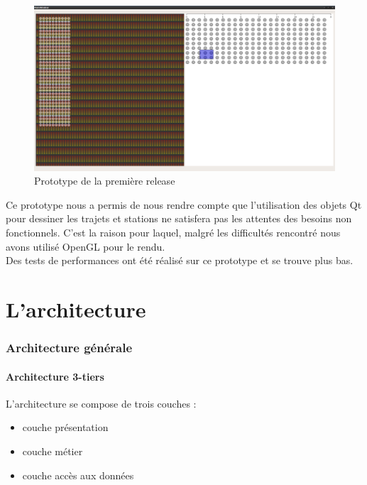 \documentclass[12pt]{article}
\begin{document}
	\begin{figure}[!h]
	\begin{center}
	\includegraphics[scale=0.2]{prototype1_screen_shot.png}
	\caption{Prototype de la première release}
	\end{center}
	\end{figure}		
	
	Ce prototype nous a permis de nous rendre compte que l’utilisation des objets Qt pour
	dessiner les trajets et stations ne satisfera pas les attentes des besoins non
	fonctionnels. C’est la raison pour laquel, malgré les difficultés rencontré
	nous avons utilisé OpenGL pour le rendu.\\
	
	Des tests de performances ont été réalisé sur ce prototype et se trouve plus bas.\\

\part{L'architecture}

	\section{Architecture générale}
		\subsection{Architecture 3-tiers}
		L’architecture se compose de trois couches :
		\begin{itemize}
			\item couche présentation
			\item couche métier 
			\item couche accès aux données
		\end{itemize}
			
\end{document}
